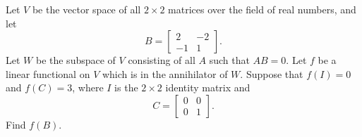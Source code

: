  Let $V$ be the vector space of all $2\times2$ matrices over
the field of real numbers, and let
\begin{equation*}
  B =
  \begin{bmatrix}
    2 & -2 \\
    -1 & 1
  \end{bmatrix}.
\end{equation*}
Let $W$ be the subspace of $V$ consisting of all $A$ such that
$AB = 0$. Let $f$ be a linear functional on $V$ which is in the
annihilator of $W$. Suppose that $f(I) = 0$ and $f(C) = 3$, where $I$
is the $2\times2$ identity matrix and
\begin{equation*}
  C =
  \begin{bmatrix}
    0 & 0 \\
    0 & 1
  \end{bmatrix}.
\end{equation*}
Find $f(B)$.
